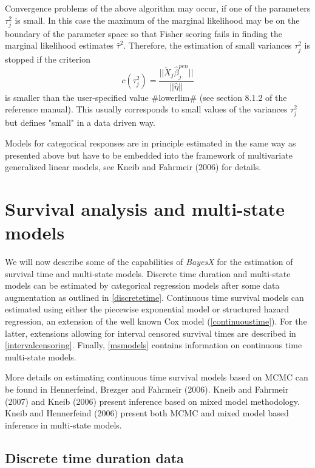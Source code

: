 \documentclass[11pt,a4paper,twoside]{bayesxarticle}
\begin{document}
Convergence problems of the above algorithm may occur, if one of the
parameters $\tau_j^2$ is small. In this case the maximum of the
marginal likelihood may be on the boundary of the parameter space so
that Fisher scoring fails in finding the marginal likelihood
estimates $\hat{\tau}^2$. Therefore, the estimation of small
variances $\tau_j^2$ is stopped if the criterion
\begin{equation}\label{remlstopcrit}
 c(\tau_j^2)=\frac{||\tilde{X}_j\hat{\beta}_j^{pen}||}{||\hat{\eta}||}
\end{equation}
is smaller than the user-specified value #lowerlim# (see section
8.1.2 of the reference manual). This usually corresponds to small
values of the variances $\tau_j^2$ but defines "small" in a data
driven way.

Models for categorical responses are in principle estimated in the
same way as presented above but have to be embedded into the
framework of multivariate generalized linear models, see Kneib and
Fahrmeir (2006) for details.

\section{Survival analysis and multi-state models}
\label{survivalAnalysis}

We will now describe some of the capabilities of {\em BayesX} for
the estimation of survival time and multi-state models. Discrete
time duration and multi-state models can be estimated by categorical
regression models after some data augmentation as outlined in
\autoref{discretetime}. Continuous time survival models can
estimated using either the piecewise exponential model or structured
hazard regression, an extension of the well known Cox model
(\autoref{continuoustime}). For the latter, extensions allowing for
interval censored survival times are described in
\autoref{intervalcensoring}. Finally, \autoref{msmodels} contains
information on continuous time multi-state models.

More details on estimating continuous time survival models based on
MCMC can be found in Hennerfeind, Brezger and Fahrmeir (2006). Kneib
and Fahrmeir (2007) and Kneib (2006) present inference based on
mixed model methodology. Kneib and Hennerfeind (2006) present both
MCMC and mixed model based inference in multi-state models.


\subsection{Discrete time duration data}
\label{discretetime}
\end{document}
